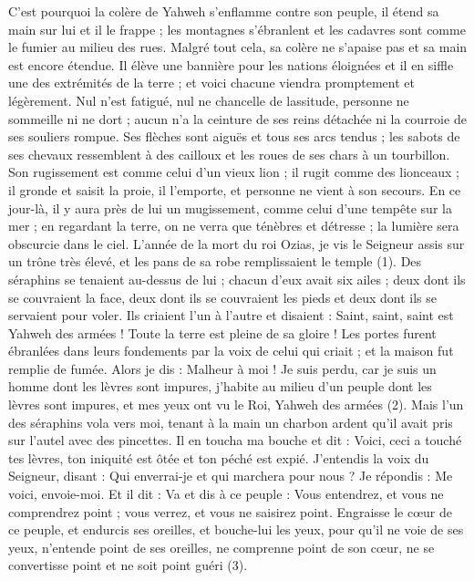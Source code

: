 \begin{multicols}{2}
C'est pourquoi la colère de Yahweh s’enflamme contre son peuple, il étend sa main sur lui et il le frappe ; les montagnes s’ébranlent et les cadavres sont comme le fumier au milieu des rues. Malgré tout cela, sa colère ne s’apaise pas et sa main est encore étendue.
Il élève une bannière pour les nations éloignées et il en siffle une des extrémités de la terre ; et voici chacune viendra promptement et légèrement.
Nul n’est fatigué, nul ne chancelle de lassitude, personne ne sommeille ni ne dort ; aucun n’a la ceinture de ses reins détachée ni la courroie de ses souliers rompue.
Ses flèches sont aiguës et tous ses arcs tendus ; les sabots de ses chevaux ressemblent à des cailloux et les roues de ses chars à un tourbillon.
Son rugissement est comme celui d’un vieux lion ; il rugit comme des lionceaux ; il gronde et saisit la proie, il l'emporte, et personne ne vient à son secours.
En ce jour-là, il y aura près de lui un mugissement, comme celui d’une tempête sur la mer ; en regardant la terre, on ne verra que ténèbres et détresse ; la lumière sera obscurcie dans le ciel.
\VerseOne{}L'année de la mort du roi Ozias, je vis le Seigneur assis sur un trône très élevé, et les pans de sa robe remplissaient le temple (1).
Des séraphins se tenaient au-dessus de lui ; chacun d'eux avait six ailes ; deux dont ils se couvraient la face, deux dont ils se couvraient les pieds et deux dont ils se servaient pour voler.
Ils criaient l'un à l'autre et disaient : Saint, saint, saint est Yahweh des armées ! Toute la terre est pleine de sa gloire !
Les portes furent ébranlées dans leurs fondements par la voix de celui qui criait ; et la maison fut remplie de fumée.
Alors je dis : Malheur à moi ! Je suis perdu, car je suis un homme dont les lèvres sont impures, j’habite au milieu d’un peuple dont les lèvres sont impures, et mes yeux ont vu le Roi, Yahweh des armées (2).
Mais l'un des séraphins vola vers moi, tenant à la main un charbon ardent qu'il avait pris sur l'autel avec des pincettes.
Il en toucha ma bouche et dit : Voici, ceci a touché tes lèvres, ton iniquité est ôtée et ton péché est expié.
J’entendis la voix du Seigneur, disant : Qui enverrai-je et qui marchera pour nous ? Je répondis : Me voici, envoie-moi.
Et il dit : Va et dis à ce peuple : Vous entendrez, et vous ne comprendrez point ; vous verrez, et vous ne saisirez point.
Engraisse le cœur de ce peuple, et endurcis ses oreilles, et bouche-lui les yeux, pour qu’il ne voie de ses yeux, n’entende point de ses oreilles, ne comprenne point de son cœur, ne se convertisse point et ne soit point guéri (3).

\end{multicols}
